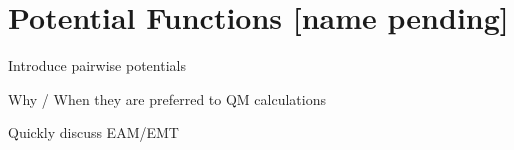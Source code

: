 \section{Potential Functions [name pending]}
\label{sec:potentials}

\bit
\item Introduce pairwise potentials
\item Why / When they are preferred to QM calculations
\item Quickly discuss EAM/EMT
\eit
